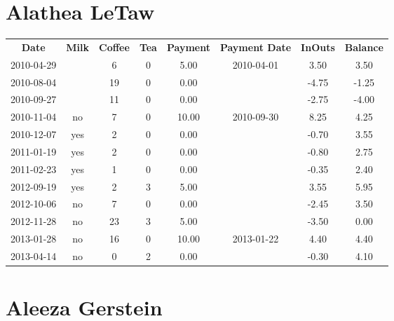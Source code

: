 \section{Alathea LeTaw}

\begin{center}
\begin{tabular}{cccccccc}
\textbf{Date} & \textbf{Milk} & \textbf{Coffee} & \textbf{Tea} & \textbf{Payment} & \textbf{Payment Date} & \textbf{InOuts} & \textbf{Balance} \\
2010-04-29 &  &  6 & 0 &  5.00 & 2010-04-01 &  3.50 &  3.50\\ 
2010-08-04 &  & 19 & 0 &  0.00 &  & -4.75 & -1.25\\ 
2010-09-27 &  & 11 & 0 &  0.00 &  & -2.75 & -4.00\\ 
2010-11-04 & no &  7 & 0 & 10.00 & 2010-09-30 &  8.25 &  4.25\\ 
2010-12-07 & yes &  2 & 0 &  0.00 &  & -0.70 &  3.55\\ 
2011-01-19 & yes &  2 & 0 &  0.00 &  & -0.80 &  2.75\\ 
2011-02-23 & yes &  1 & 0 &  0.00 &  & -0.35 &  2.40\\ 
2012-09-19 & yes &  2 & 3 &  5.00 &  &  3.55 &  5.95\\ 
2012-10-06 & no &  7 & 0 &  0.00 &  & -2.45 &  3.50\\ 
2012-11-28 & no & 23 & 3 &  5.00 &  & -3.50 &  0.00\\ 
2013-01-28 & no & 16 & 0 & 10.00 & 2013-01-22 &  4.40 &  4.40\\ 
2013-04-14 & no &  0 & 2 &  0.00 &  & -0.30 &  4.10
\end{tabular}
\end{center}

\section{Aleeza Gerstein}


